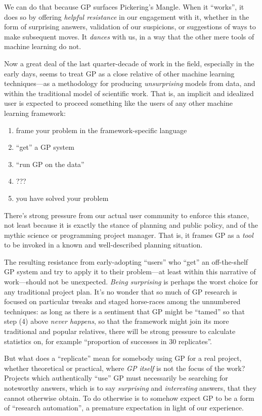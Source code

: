 We can do that because GP surfaces Pickering's Mangle. When it ``works'', it does so by offering \emph{helpful resistance} in our engagement with it, whether in the form of surprising answers, validation of our suspicions, or suggestions of ways to make subsequent moves. It \emph{dances} with us, in a way that the other mere tools of machine learning do not.

Now a great deal of the last quarter-decade of work in the field, especially in the early days, seems to treat GP as a close relative of other machine learning techniques---as a methodology for producing \emph{unsurprising} models from data, and within the traditional model of scientific work. That is, an implicit and idealized user is expected to proceed something like the users of any other machine learning framework:

\begin{enumerate}
\item frame your problem in the framework-specific language
\item ``get'' a GP system
\item ``run GP on the data''
\item ???
\item you have solved your problem
\end{enumerate}

There's strong pressure from our actual user community to enforce this stance, not least because it is exactly the stance of planning and public policy, and of the mythic science or programming project manager. That is, it frames GP as a \emph{tool} to be invoked in a known and well-described planning situation.

The resulting resistance from early-adopting ``users'' who ``get'' an off-the-shelf GP system and try to apply it to their problem---at least within this narrative of work---should not be unexpected. \emph{Being surprising} is perhaps the worst choice for any traditional project plan. It's no wonder that so much of GP research is focused on particular tweaks and staged horse-races among the unnumbered techniques: as long as there is a sentiment that GP might be ``tamed'' so that step (4) above \emph{never happens}, so that the framework might join its more traditional and popular relatives, there will be strong pressure to calculate statistics on, for example ``proportion of successes in 30 replicates''.

But what does a ``replicate'' mean for somebody using GP for a real project, whether theoretical or practical, where \emph{GP itself} is not the focus of the work? Projects which authentically ``use'' GP must necessarily be searching for noteworthy answers, which is to say \emph{surprising} and \emph{interesting} answers, that they cannot otherwise obtain. To do otherwise is to somehow expect GP to be a form of ``research automation'', a premature expectation in light of our experience.

